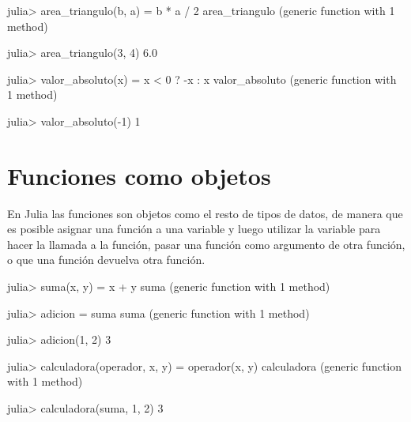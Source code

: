 \documentclass[
  letterpaper,
  DIV=11,
  numbers=noendperiod]{scrreprt}
\newenvironment{Shaded}{\begin{snugshade}}{\end{snugshade}}
\newcommand{\FloatTok}[1]{\textcolor[rgb]{0.68,0.00,0.00}{#1}}
\newcommand{\FunctionTok}[1]{\textcolor[rgb]{0.28,0.35,0.67}{#1}}
\newcommand{\KeywordTok}[1]{\textcolor[rgb]{0.00,0.23,0.31}{#1}}
\newcommand{\NormalTok}[1]{\textcolor[rgb]{0.00,0.23,0.31}{#1}}
\newcommand{\OperatorTok}[1]{\textcolor[rgb]{0.37,0.37,0.37}{#1}}
\begin{document}
\begin{Shaded}
\begin{Highlighting}[]
\NormalTok{julia}\OperatorTok{\textgreater{}} \FunctionTok{area\_triangulo}\NormalTok{(b, a) }\OperatorTok{=}\NormalTok{ b }\OperatorTok{*}\NormalTok{ a }\OperatorTok{/} \FloatTok{2}
\NormalTok{area\_triangulo (generic }\KeywordTok{function}\NormalTok{ with }\FloatTok{1}\NormalTok{ method)}

\NormalTok{julia}\OperatorTok{\textgreater{}} \FunctionTok{area\_triangulo}\NormalTok{(}\FloatTok{3}\NormalTok{, }\FloatTok{4}\NormalTok{)}
\FloatTok{6.0}

\NormalTok{julia}\OperatorTok{\textgreater{}} \FunctionTok{valor\_absoluto}\NormalTok{(x) }\OperatorTok{=}\NormalTok{ x }\OperatorTok{\textless{}} \FloatTok{0}\NormalTok{ ? }\OperatorTok{{-}}\NormalTok{x }\OperatorTok{:}\NormalTok{ x}
\NormalTok{valor\_absoluto (generic }\KeywordTok{function}\NormalTok{ with }\FloatTok{1}\NormalTok{ method)}

\NormalTok{julia}\OperatorTok{\textgreater{}} \FunctionTok{valor\_absoluto}\NormalTok{(}\OperatorTok{{-}}\FloatTok{1}\NormalTok{)}
\FloatTok{1}
\end{Highlighting}
\end{Shaded}

\hypertarget{funciones-como-objetos}{%
\section{Funciones como objetos}\label{funciones-como-objetos}}

En Julia las funciones son objetos como el resto de tipos de datos, de
manera que es posible asignar una función a una variable y luego
utilizar la variable para hacer la llamada a la función, pasar una
función como argumento de otra función, o que una función devuelva otra
función.

\begin{Shaded}
\begin{Highlighting}[]
\NormalTok{julia}\OperatorTok{\textgreater{}} \FunctionTok{suma}\NormalTok{(x, y) }\OperatorTok{=}\NormalTok{ x }\OperatorTok{+}\NormalTok{ y}
\NormalTok{suma (generic }\KeywordTok{function}\NormalTok{ with }\FloatTok{1}\NormalTok{ method)}

\NormalTok{julia}\OperatorTok{\textgreater{}}\NormalTok{ adicion }\OperatorTok{=}\NormalTok{ suma}
\NormalTok{suma (generic }\KeywordTok{function}\NormalTok{ with }\FloatTok{1}\NormalTok{ method)}

\NormalTok{julia}\OperatorTok{\textgreater{}} \FunctionTok{adicion}\NormalTok{(}\FloatTok{1}\NormalTok{, }\FloatTok{2}\NormalTok{)}
\FloatTok{3}

\NormalTok{julia}\OperatorTok{\textgreater{}} \FunctionTok{calculadora}\NormalTok{(operador, x, y) }\OperatorTok{=} \FunctionTok{operador}\NormalTok{(x, y) }
\NormalTok{calculadora (generic }\KeywordTok{function}\NormalTok{ with }\FloatTok{1}\NormalTok{ method)}

\NormalTok{julia}\OperatorTok{\textgreater{}} \FunctionTok{calculadora}\NormalTok{(suma, }\FloatTok{1}\NormalTok{, }\FloatTok{2}\NormalTok{)}
\FloatTok{3}
\end{Highlighting}
\end{Shaded}
\end{document}
